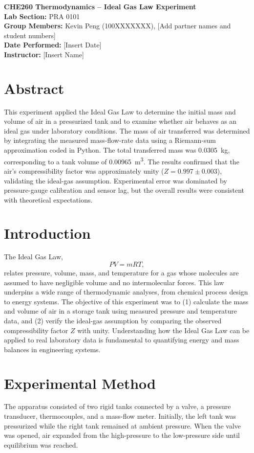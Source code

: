 \documentclass[12pt]{article}
\begin{document}
\begin{center}
\textbf{\Large CHE260 Thermodynamics – Ideal Gas Law Experiment}\\[0.5em]
\textbf{Lab Section:} PRA 0101 \\
\textbf{Group Members:} Kevin Peng (100XXXXXXX), [Add partner names and student numbers] \\[0.5em]
\textbf{Date Performed:} [Insert Date] \\
\textbf{Instructor:} [Insert Name]
\end{center}

\section*{Abstract}
This experiment applied the Ideal Gas Law to determine the initial mass and volume of air in a pressurized tank and to examine whether air behaves as an ideal gas under laboratory conditions. The mass of air transferred was determined by integrating the measured mass-flow-rate data using a Riemann-sum approximation coded in Python. The total transferred mass was \SI{0.0305}{\kilogram}, corresponding to a tank volume of \SI{0.00965}{\metre\cubed}. The results confirmed that the air’s compressibility factor was approximately unity (\(Z = 0.997 \pm 0.003\)), validating the ideal-gas assumption. Experimental error was dominated by pressure-gauge calibration and sensor lag, but the overall results were consistent with theoretical expectations.

\section*{Introduction}
The Ideal Gas Law,
\[
PV = m R T,
\]
relates pressure, volume, mass, and temperature for a gas whose molecules are assumed to have negligible volume and no intermolecular forces. This law underpins a wide range of thermodynamic analyses, from chemical process design to energy systems. The objective of this experiment was to (1) calculate the mass and volume of air in a storage tank using measured pressure and temperature data, and (2) verify the ideal-gas assumption by comparing the observed compressibility factor \(Z\) with unity. Understanding how the Ideal Gas Law can be applied to real laboratory data is fundamental to quantifying energy and mass balances in engineering systems.

\section*{Experimental Method}
The apparatus consisted of two rigid tanks connected by a valve, a pressure transducer, thermocouples, and a mass-flow meter. Initially, the left tank was pressurized while the right tank remained at ambient pressure. When the valve was opened, air expanded from the high-pressure to the low-pressure side until equilibrium was reached.
\end{document}
